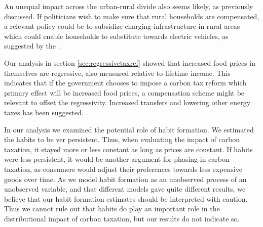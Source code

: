 An unequal impact across the urban-rural divide also seems likely, as previously discussed. If politicians wish to make sure that rural households are compensated, a relevant policy could be to subsidize charging infrastructure in rural areas which could enable households to substitute towards electric vehicles, as suggested by the \cite{eldrupkommission2021}.

Our analysis in section \ref{sec:regressivetaxref} showed that increased food prices in themselves are regressive, also measured relative to lifetime income. This indicates that if the government chooses to impose a carbon tax reform which primary effect will be increased food prices, a compensation scheme might be relevant to offset the regressivity. Increased transfers and lowering other energy taxes has been suggested. \cite{dmoer2021,Kraka2020}.

In our analysis we examined the potential role of habit formation. We estimated the habits to be ver persistent. Thus, when evaluating the impact of carbon taxation, it stayed more or less constant as long as prices are constant. If habits were less persistent, it would be another argument for phasing in carbon taxation, as consumers would adjust their preferences towards less expensive goods over time. As we model habit formation as an unobserved process of an unobserved variable, and that different models gave quite different results, we believe that our habit formation estimates should be interpreted with caution. Thus we cannot rule out that habits do play an important role in the distributional impact of carbon taxation, but our results do not indicate so. 



